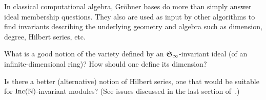 
In classical computational algebra, Gr\"obner bases do more than simply answer ideal membership questions.  They also are used as input by other algorithms to find invariants describing the underlying geometry and algebra such as dimension, degree, Hilbert series, etc.  

\begin{question}
What is a good notion of the variety defined by an $\mathfrak S_\infty$-invariant ideal (of an infinite-dimensional ring)? How should one define its dimension? 
\end{question}

\begin{question}
Is there a better (alternative) notion of Hilbert series, one that would be suitable for $\operatorname{Inc}(\mathbb N)$-invariant modules? 
(See issues discussed in the last section of~\cite{krone2016hilbert}.) 
\end{question}






